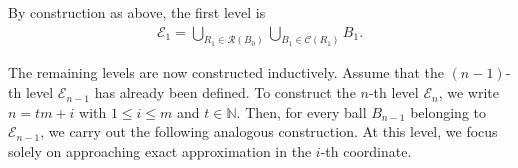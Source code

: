 \documentclass[11pt]{amsart}
\numberwithin{equation}{section}
\newcommand{\0}{\mathbf{0}}
\theoremstyle{remark}
\begin{document}
{\begin{enumerate}
\end{enumerate}

By construction as above, the first level is
\begin{align*}
\mathcal{E}_1=\bigcup_{R_{1}\in\mathcal{R}(B_0)}\bigcup_{B_{1}\in\mathcal{C}(R_{1})}B_1.
\end{align*}

The remaining levels are now constructed inductively. Assume that the $(n-1)$-th level $\mathcal{E}_{n-1}$ has already been defined. To construct the $n$-th level $\mathcal{E}_n$, we write $n=tm+i$ with $1\le i\le m$ and $t\in \mathbb{N}$. Then, for every ball $B_{n-1}$ belonging to $\mathcal{E}_{n-1}$, we carry out the following analogous construction. At this level, we focus solely on approaching exact approximation in the $i$-th coordinate.

}
\end{document}
